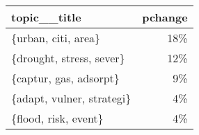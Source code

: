 \begin{tabular}{p{1.2cm}r}
\toprule
              topic\_\_title &  pchange \\
\midrule
       \{urban, citi, area\} &      18\% \\
  \{drought, stress, sever\} &      12\% \\
    \{captur, gas, adsorpt\} &       9\% \\
 \{adapt, vulner, strategi\} &       4\% \\
      \{flood, risk, event\} &       4\% \\
\bottomrule
\end{tabular}
